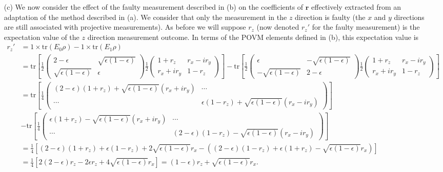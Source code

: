\documentclass[10pt, a4paper]{article}
\begin{document}
{\begin{enumerate}
  \item[(c)] We now consider the effect of the faulty measurement described in (b) on the coefficients of $\mathbf{r}$ effectively extracted from an adaptation of the method described in (a). We consider that only the measurement in the $z$ direction is faulty (the $x$ and $y$ directions are still associated with projective measurements). As before we will suppose $r_z$ (now denoted $r_z'$ for the faulty measurement) is the expectation value of the $z$ direction measurement outcome. In terms of the POVM elements defined in (b), this expectation value is 
  \begin{align*}
    r_z' &= 1\times \text{tr}(E_0 \rho) - 1 \times \text{tr}(E_1 \rho) \\
    &= \text{tr}\left[\frac{1}{2}
    \begin{pmatrix}
      2 - \epsilon & \sqrt{\epsilon(1-\epsilon)}\\
      \sqrt{\epsilon(1-\epsilon)} & \epsilon
    \end{pmatrix} \frac{1}{2}
    \begin{pmatrix}
      1 + r_z & r_x - i r_y\\
      r_x + i r_y & 1 - r_z
    \end{pmatrix}\right] 
    - \text{tr}\left[\frac{1}{2}
    \begin{pmatrix}
      \epsilon & -\sqrt{\epsilon(1-\epsilon)}\\
      -\sqrt{\epsilon(1-\epsilon)} & 2-\epsilon
    \end{pmatrix} \frac{1}{2}
    \begin{pmatrix}
      1 + r_z & r_x - i r_y\\
      r_x + i r_y & 1 - r_z
    \end{pmatrix}\right]\\
    &= 
    \text{tr}\left[\frac{1}{4}
    \begin{pmatrix}
      (2 - \epsilon)(1 + r_z) + \sqrt{\epsilon(1-\epsilon)} (r_x + i r_y) & \cdots\\
      \cdots  & \epsilon(1 - r_z) + \sqrt{\epsilon(1-\epsilon)} (r_x - i r_y)
    \end{pmatrix}\right] \\
    &
    - \text{tr}\left[\frac{1}{4}
    \begin{pmatrix}
      \epsilon (1 + r_z) -\sqrt{\epsilon(1-\epsilon)} (r_x + i r_y) & \cdots\\
      \cdots & (2-\epsilon)(1-r_z) -\sqrt{\epsilon(1-\epsilon)} (r_x - i r_y)
    \end{pmatrix}\right]\\
    &= \frac{1}{4}\left[(2 - \epsilon)(1 + r_z) + \epsilon(1 - r_z) + 2\sqrt{\epsilon(1-\epsilon)} r_x - \left((2-\epsilon)(1-r_z) + \epsilon (1 + r_z) -\sqrt{\epsilon(1-\epsilon)} r_x\right)\right]\\
    &= \frac{1}{4}\left[2 (2 - \epsilon)r_z - 2\epsilon r_z + 4\sqrt{\epsilon(1-\epsilon)} r_x\right] =  (1 - \epsilon)r_z + \sqrt{\epsilon(1-\epsilon)} r_x.
  \end{align*} 
\end{enumerate}

}
\end{document}
